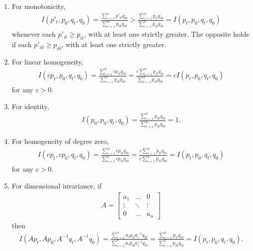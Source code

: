 \documentclass[]{article}
\begin{document}
\begin{enumerate}
\def\labelenumi{\arabic{enumi}.}
\item
  For monotonicity,
  \begin{align*}
  I(p'_{t}, p_{0}, q_{t}, q_{0}) =  \frac{\sum_{i=1}^{n} p'_{it}q_{i0}}{\sum_{i=1}^{n} p_{i0}q_{i0}} > \frac{\sum_{i=1}^{n} p_{it}q_{i0}}{\sum_{i=1}^{n} p_{i0}q_{i0}} = I(p_{t}, p_{0}, q_{t}, q_{0}) 
   \end{align*}
  whenever each \(p'_{it} \geq p_{it}\), with at least one strictly greater. The opposite holds if each \(p'_{i0} \geq p_{i0}\), with at least one strictly greater.
\item
  For linear homogeneity,
  \begin{align*}
  I(cp_{t}, p_{0}, q_{t}, q_{0}) =  \frac{\sum_{i=1}^{n} cp_{it}q_{i0}}{\sum_{i=1}^{n} p_{i0}q_{i0}} = \frac{c\sum_{i=1}^{n} p_{it}q_{i0}}{\sum_{i=1}^{n} p_{i0}q_{i0}} = cI(p_{t}, p_{0}, q_{t}, q_{0}) 
   \end{align*}
  for any \(c > 0\).
\item
  For identity,
  \begin{align*}
  I(p_{0}, p_{0}, q_{t}, q_{0}) =  \frac{\sum_{i=1}^{n} p_{i0}q_{i0}}{\sum_{i=1}^{n} p_{i0}q_{i0}} = 1.
   \end{align*}
\item
  For homogeneity of degree zero,
  \begin{align*}
  I(cp_{t}, cp_{0}, q_{t}, q_{0}) =  \frac{\sum_{i=1}^{n} cp_{it}q_{i0}}{\sum_{i=1}^{n} cp_{i0}q_{i0}} = \frac{c\sum_{i=1}^{n} p_{it}q_{i0}}{c\sum_{i=1}^{n} p_{i0}q_{i0}} = I(p_{t}, p_{0}, q_{t}, q_{0}) 
   \end{align*}
  for any \(c > 0\).
\item
  For dimensional invariance, if
  \begin{align*}
  A = 
  \begin{bmatrix}
  a_1 & \ldots & 0 \\
  \vdots & \ddots & \vdots \\
  0 & \ldots & a_n
  \end{bmatrix}
   \end{align*}
  then
  \begin{align*}
  I(Ap_{t}, Ap_{0}, A^{-1}q_{t}, A^{-1}q_{0}) = \frac{\sum_{i=1}^{n} a_{i}p_{it}a_{i}^{-1}q_{i0}}{\sum_{i=1}^{n} a_{i}p_{i0}a_{i}^{-1}q_{i0}} = \frac{\sum_{i=1}^{n} p_{it}q_{i0}}{\sum_{i=1}^{n} p_{i0}q_{i0}} = I(p_{t}, p_{0}, q_{t}, q_{0}). 
   \end{align*}
\end{enumerate}
\end{document}
